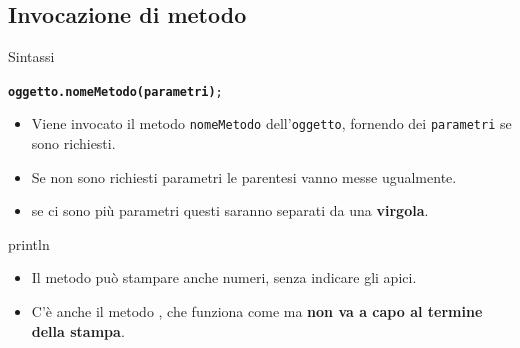\subsection{Invocazione di metodo}
\begin{frame}
\begin{block}{Sintassi}
\begin{center}
\texttt{\textbf{oggetto.nomeMetodo(parametri)};}
\end{center}
\end{block}
\begin{block}{}
\begin{itemize}
\item Viene invocato il metodo \texttt{nomeMetodo} dell'\texttt{oggetto}, fornendo dei \texttt{parametri} se sono richiesti.
\item Se non sono richiesti parametri le parentesi vanno messe ugualmente.
\item se ci sono più parametri questi saranno separati da una \textbf{virgola}.
\end{itemize}
\end{block}
\begin{block}{println}
\begin{itemize}
\item Il metodo  può stampare anche numeri, senza indicare gli apici.
\item C'è anche il metodo , che funziona come  ma \textbf{non va a capo al termine 
della stampa}.
\end{itemize}
\end{block}
\end{frame}

